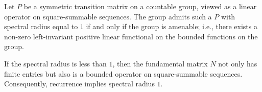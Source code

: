 Let $P$ be a symmetric transition matrix on a countable group, viewed as a linear operator on square-summable sequences. The group admits such a $P$ with spectral radius equal to $1$ if and only if the group is amenable; i.e., there exists a non-zero left-invariant positive linear functional on the bounded functions on the group.

If the spectral radius is less than $1$, then the fundamental matrix $N$ not only has finite entries but also is a bounded operator on square-summable sequences. Consequently, recurrence implies spectral radius $1$.
